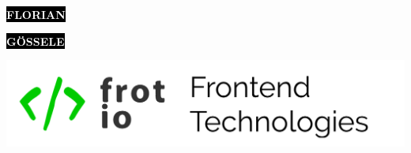 \documentclass[9pt]{developercv} %
\begin{document}

\begin{minipage}[t]{0.45\textwidth} %
	\vspace{-\baselineskip} %
	
	\colorbox{black}{{\HUGE\textcolor{white}{\textbf{\MakeUppercase{Florian}}}}} %
	
	\colorbox{black}{{\HUGE\textcolor{white}{\textbf{\MakeUppercase{Gössele}}}}} %
	
	\vspace{6pt}
	
	{\includegraphics[scale=0.57]{logo.png}} %
\end{minipage}
\begin{minipage}[t]{0.275\textwidth} %
	\vspace{-\baselineskip} %
	
	\\
	\\
	\href{mailto:moin@frot.io}{}\\	
\end{minipage}
\begin{minipage}[t]{0.275\textwidth} %
	\vspace{-\baselineskip} %
	
	\href{https://frot.io}{}\\
	\href{https://github.com/frot-io}{}\\
	\href{https://twitter.com/@frot\_io}{}\\
\end{minipage}
\end{document}
